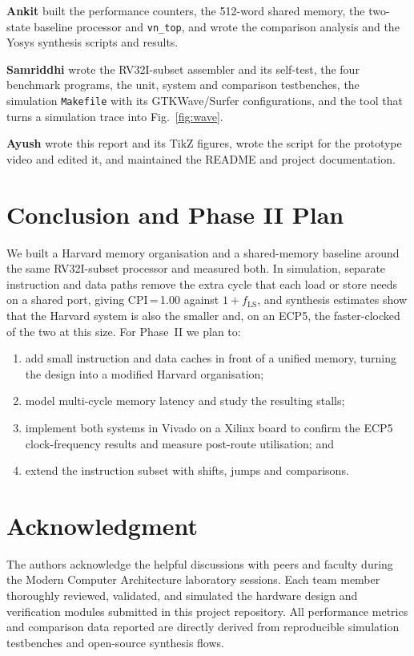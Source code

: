 \documentclass[conference]{IEEEtran}
\newcommand{\sig}[1]{\texttt{#1}}
\begin{document}
\textbf{Ankit} built the performance counters, the 512-word shared memory, the two-state baseline
processor and \sig{vn\_top}, and wrote the comparison analysis and the Yosys synthesis
scripts and results.

\textbf{Samriddhi} wrote the RV32I-subset assembler and its self-test, the four benchmark
programs, the unit, system and comparison testbenches, the simulation \sig{Makefile} with its
GTKWave/Surfer configurations, and the tool that turns a simulation trace into Fig.~\ref{fig:wave}.

\textbf{Ayush} wrote this report and its TikZ figures, wrote the script for the prototype
video and edited it, and maintained the README and project documentation.

\section{Conclusion and Phase II Plan}
We built a Harvard memory organisation and a shared-memory baseline around the same
RV32I-subset processor and measured both. In simulation, separate instruction and data paths
remove the extra cycle that each load or store needs on a shared port, giving CPI\,=\,1.00
against $1 + f_{\text{LS}}$, and synthesis estimates show that the Harvard system is also the
smaller and, on an ECP5, the faster-clocked of the two at this size. For Phase~II we plan to:
\begin{enumerate}
  \item add small instruction and data caches in front of a unified memory, turning the design
        into a modified Harvard organisation;
  \item model multi-cycle memory latency and study the resulting stalls;
  \item implement both systems in Vivado on a Xilinx board to confirm the ECP5 clock-frequency
        results and measure post-route utilisation; and
  \item extend the instruction subset with shifts, jumps and comparisons.
\end{enumerate}

\section*{Acknowledgment}
The authors acknowledge the helpful discussions with peers and faculty during the Modern
Computer Architecture laboratory sessions. Each team member thoroughly reviewed, validated, and
simulated the hardware design and verification modules submitted in this project repository.
All performance metrics and comparison data reported are directly derived from reproducible
simulation testbenches and open-source synthesis flows.



\end{document}
